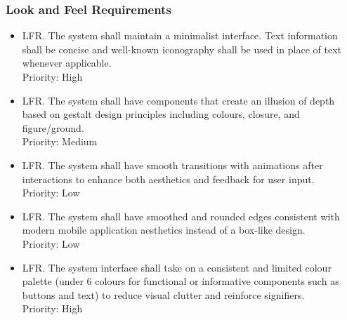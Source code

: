 \documentclass[12pt]{article}
\newcounter{lfrnum} %
\begin{document}
\subsubsection{Look and Feel Requirements}

\begin {itemize}
\item[LFR\refstepcounter{lfrnum}\thelfrnum \label{R_Output}.] The system shall maintain a minimalist interface. Text information shall be concise and well-known iconography shall be used in place of text whenever applicable.\\
    Priority: High

\item[LFR\refstepcounter{lfrnum}\thelfrnum \label{R_Output}.] The system shall have components that create an illusion of depth based on gestalt design principles including colours, closure, and figure/ground.\\
    Priority: Medium
    
\item[LFR\refstepcounter{lfrnum}\thelfrnum \label{R_Output}.] The system shall have smooth transitions with animations after interactions to enhance both aesthetics and feedback for user input.\\
    Priority: Low
    
\item[LFR\refstepcounter{lfrnum}\thelfrnum \label{R_Output}.] The system shall have smoothed and rounded edges consistent with modern mobile application aesthetics instead of a box-like design.\\
    Priority: Low

\item[LFR\refstepcounter{lfrnum}\thelfrnum \label{R_Output}.] The system interface shall take on a consistent and limited colour palette (under 6 colours for functional or informative components such as buttons and text) to reduce visual clutter and reinforce signifiers.\\
    Priority: High
\end {itemize}
\end{document}
